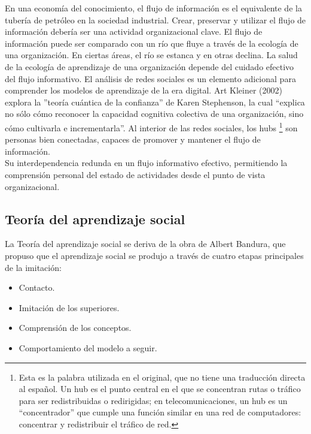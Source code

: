 En una econom\'ia del conocimiento, el flujo de informaci\'on es el equivalente de la tuber\'ia de petr\'oleo en la sociedad 
industrial. Crear, preservar y utilizar el flujo de informaci\'on deber\'ia ser una actividad organizacional clave. 
El flujo de informaci\'on puede ser comparado con un r\'io que fluye a trav\'es de la ecolog\'ia de una organizaci\'on. 
En ciertas \'areas, el r\'io se estanca y en otras declina. La salud de la ecolog\'ia de aprendizaje de una organizaci\'on depende
del cuidado efectivo del flujo informativo. El an\'alisis de redes sociales es un elemento adicional para comprender los 
modelos de aprendizaje de la era digital. Art Kleiner (2002) explora la ''teor\'ia cu\'antica de la confianza'' de Karen 
Stephenson, la cual ``explica no s\'olo c\'omo reconocer la capacidad cognitiva colectiva de una organizaci\'on, sino c\'omo 
cultivarla e incrementarla''. Al interior de las redes sociales, los hubs \footnote{Esta es la palabra utilizada en el 
original, que no tiene una traducci\'on directa al espa\~nol. Un hub es el punto central en el que se concentran rutas o 
tr\'afico para ser redistribuidas o redirigidas; en telecomunicaciones, un hub es un ``concentrador'' que cumple una funci\'on 
similar en una red de computadores: concentrar y redistribuir el tr\'afico de red.} son personas bien conectadas, capaces 
de promover y mantener el flujo de informaci\'on.\\

Su interdependencia redunda en un flujo informativo efectivo, permitiendo la comprensi\'on personal del estado de actividades
desde el punto de vista organizacional. 
\subsection{Teor\'ia del aprendizaje social}
La Teor\'ia del aprendizaje social se deriva de la obra de Albert Bandura, que propuso que el aprendizaje social se produjo a 
trav\'es de cuatro etapas principales de la imitaci\'on:
\begin{itemize}
 \item Contacto.
 \item Imitaci\'on de los superiores.  
 \item Comprensi\'on de los conceptos.
 \item Comportamiento del modelo a seguir.
\end{itemize}


